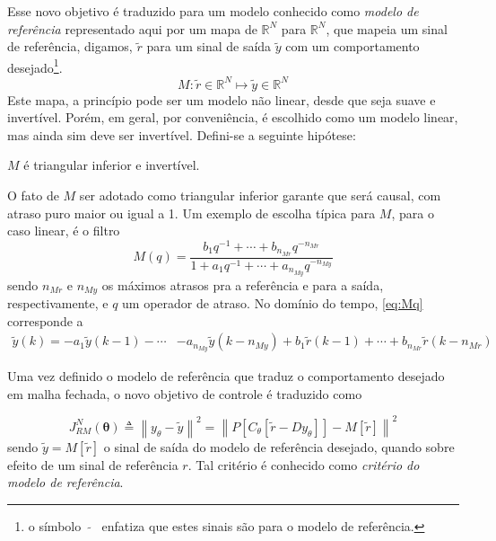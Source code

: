 Esse novo objetivo é traduzido para um modelo conhecido como \textit{modelo de referência} representado aqui por um mapa de $\mathbb{R}^{N}$ para $\mathbb{R}^{N}$, que mapeia um sinal de referência, digamos, $\tilde{r}$ para um sinal de saída $\tilde{y}$ com um comportamento desejado\footnote{o símbolo \ $\tilde{}$ \ enfatiza que estes sinais são para o modelo de referência.}.
\begin{equation}
   M:\tilde{r} \in \mathbb{R}^N \mapsto \tilde{y} \in \mathbb{R}^N
\label{eq:Mmap}
\end{equation}
Este mapa, a princípio pode ser um modelo não linear, desde que seja suave e invertível. Porém, em geral, por conveniência, é escolhido como um modelo linear, mas ainda sim deve ser invertível. Defini-se a seguinte hipótese:
\begin{assum}
   $M$ é triangular inferior e invertível.
\end{assum}
O fato de $M$ ser adotado como triangular inferior garante que será causal, com atraso puro maior ou igual a 1.
Um exemplo de escolha típica para $M$, para o caso linear, é o filtro
\begin{equation}
   M(q)=\frac{b_{1} q^{-1}+\cdots+b_{n_{M r}} q^{-n_{M r}}}{1+a_{1} q^{-1}+\cdots+a_{n_{M y}} q^{-n_{M y}}}
\label{eq:Mq}
\end{equation}
sendo $n_{Mr}$ e $n_{My}$ os máximos atrasos pra a referência e para a saída, respectivamente, e $q$ um operador de atraso. No domínio do tempo, \eqref{eq:Mq} corresponde a 
\begin{align}
   \label{eq:ytMr}
   \tilde{y}(k)=-a_{1} \tilde{y}(k-1)-\cdots &-a_{n_{M y}} \tilde{y}\left(k-n_{M y}\right) +b_{1} \tilde{r}(k-1)+\cdots+b_{n_{M r}} \tilde{r}\left(k-n_{M r}\right)
\end{align}

Uma vez definido o modelo de referência que traduz o comportamento desejado em malha fechada, o novo objetivo de controle é traduzido como

\begin{equation}
   J_{RM}^N(\bm{\theta}) \triangleq \left\lVert y_\theta - \tilde{y} \right\lVert^{2} = \left\lVert P[C_\theta[\tilde{r}-Dy_\theta]] - M[\tilde{r}] \right\lVert^{2}
   \label{eq:Jy}
\end{equation}
sendo $\tilde{y} = M[\tilde{r}]$ o sinal de saída do modelo de referência desejado, quando sobre efeito de um sinal de referência $r$. Tal critério é conhecido como \textit{critério do modelo de referência}.



